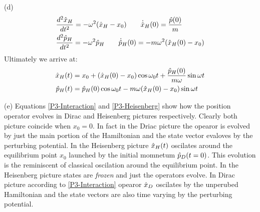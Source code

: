 \begin{homeworkProblem}
\begin{homeworkSection}{(d)}
\begin{align}
&\frac{d^2\Hat{x}_H}{dt^2}=-\omega^2(\Hat{x}_H-x_0)\qquad\dot{\Hat{x}}_H(0)=\frac{\Hat{p}(0)}{m}\\
&\frac{d^2\Hat{p}_H}{dt^2}=-\omega^2\Hat{p}_H\qquad\dot{\Hat{p}}_H(0)=-m\omega^2(\Hat{x}_H(0)-x_0)
\end{align}
Ultimately we arrive at:
\begin{align}
\Hat{x}_{H}(t)&=x_0+(\Hat{x}_H(0)-x_0)\cos\omega_0t+\frac{\Hat{p}_H(0)}{m\omega}\sin\omega t\label{P3-Heisenberg}\\
\Hat{p}_H(t)&=\Hat{p}_H(0)\cos\omega_0t-m\omega(\Hat{x}_H(0)-x_0)\sin\omega t
\end{align}
\end{homeworkSection}
\begin{homeworkSection}{(e)}
Equations \eqref{P3-Interaction} and \eqref{P3-Heisenberg} show how the position operator evolves in Dirac and Heisenberg pictures respectively. Clearly both picture coincide when $x_0=0$. In fact in the Driac picture the opearor is evolved by just the main portion of the Hamiltonian and the state vector evaloves by the perturbing potential. In the Heisenberg picture $\Hat{x}_H(t)$ oscilates around the equilibrium point $x_0$ launched by the initial momnetum $\Hat{p}_D(t=0)$. This evolution is the reminiscent  of classical oscilation around the equilibrium point. In the Heisenberg picture states are \textit{frozen} and just the operators evolve. In Dirac picture according to \eqref{P3-Interaction}  opearor $\Hat{x}_D$ oscilates by the unperubed Hamiltonian and the state vectors are also time varying by the perturbing potential. 
\end{homeworkSection}


\end{homeworkProblem}